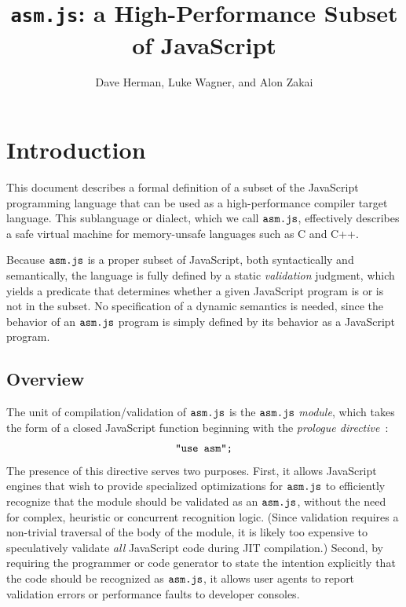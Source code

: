 \documentclass{article}
\newcommand{\mathjs}[1]{\mbox{\texttt{{#1}}}}
\begin{document}
\title{\texttt{asm.js}: a High-Performance Subset of JavaScript}
\author{Dave Herman, Luke Wagner, and Alon Zakai}
\maketitle

\section{Introduction}

This document describes a formal definition of a subset of the
JavaScript programming language that can be used as a high-performance
compiler target language. This sublanguage or dialect, which we call
$\mathjs{asm.js}$, effectively describes a safe virtual machine for
memory-unsafe languages such as C and C++.

Because $\mathjs{asm.js}$ is a proper subset of JavaScript, both
syntactically and semantically, the language is fully defined by a
static {\it validation} judgment, which yields a predicate that
determines whether a given JavaScript program is or is not in the
subset. No specification of a dynamic semantics is needed, since the
behavior of an $\mathjs{asm.js}$ program is simply defined by its
behavior as a JavaScript program.

\subsection{Overview}

The unit of compilation/validation of $\mathjs{asm.js}$ is the
$\mathjs{asm.js}$ {\it module}, which takes the form of a closed
JavaScript function beginning with the {\it prologue
directive}~\cite{es5}:
\[
\mathjs{"use asm";}
\]
The presence of this directive serves two purposes. First, it allows
JavaScript engines that wish to provide specialized optimizations for
$\mathjs{asm.js}$ to efficiently recognize that the module should be
validated as an $\mathjs{asm.js}$, without the need for complex,
heuristic or concurrent recognition logic. (Since validation requires
a non-trivial traversal of the body of the module, it is likely too
expensive to speculatively validate {\it all} JavaScript code during
JIT compilation.) Second, by requiring the programmer or code
generator to state the intention explicitly that the code should be
recognized as $\mathjs{asm.js}$, it allows user agents to report
validation errors or performance faults to developer consoles.
\end{document}

